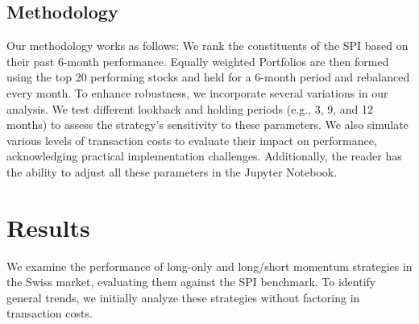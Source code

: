\documentclass[a4paper,12pt]{article}
\begin{document}
\subsection{Methodology}
Our methodology works as follows: We rank the constituents of the SPI based on their past 6-month performance. Equally weighted Portfolios are then formed using the top 20 performing stocks and held for a 6-month period and rebalanced every month. To enhance robustness, we incorporate several variations in our analysis. We test different lookback and holding periods (e.g., 3, 9, and 12 months) to assess the strategy's sensitivity to these parameters. We also simulate various levels of transaction costs to evaluate their impact on performance, acknowledging practical implementation challenges. Additionally, the reader has the ability to adjust all these parameters in the Jupyter Notebook. 



\newpage

\section{Results}
We examine the performance of long-only and long/short momentum strategies in the Swiss market, evaluating them against the SPI benchmark. To identify general trends, we initially analyze these strategies without factoring in transaction costs.
\end{document}

